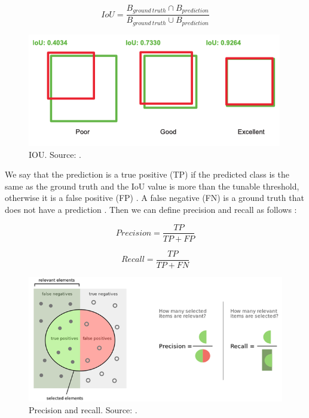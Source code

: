 \documentclass[a4paper, 11pt, oneside]{article}
\begin{document}
  $$IoU = \frac{B_{ground \ truth} \cap B_{prediction}}{B_{ground \ truth} \cup B_{prediction}}$$

  \begin{figure}[ht]
    \begin{center}
      \includegraphics[width=.8\textwidth]{iou.png}
    \end{center}
    \caption{IOU. Source: \cite{elgendy2020deep}.}
  \end{figure}

  We say that the prediction is a true positive (TP) if the predicted class is the same as the ground truth and the IoU
  value is more than the tunable threshold, otherwise it is a false positive (FP)
  \cite{liu2020deep, elgendy2020deep, planche2019hands}. A false negative (FN) is a ground truth that does not have a
  prediction \cite{planche2019hands}. Then we can define precision and recall as follows
  \cite{burkov2019hundred, davis2006relationship}:

  $$Precision = \frac{TP}{TP + FP}$$

  $$Recall = \frac{TP}{TP + FN}$$

  \begin{figure}[ht]
    \begin{center}
      \includegraphics[width=.8\textwidth]{precision_recall.png}
    \end{center}
    \caption{Precision and recall. Source: \cite{precisionrecall}.}
  \end{figure}
\end{document}

